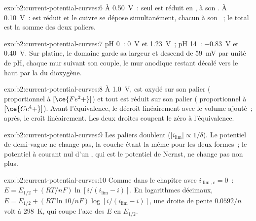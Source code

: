 \begin{solution}{exo:b2:current-potential-curves:6}
À \qty{0.50}{V}~: seul  est réduit en , à son .
À \qty{0.10}{V}~:  est réduit et le cuivre se dépose simultanément,
chacun à son ~; le total est la somme des deux paliers.
\end{solution}

\begin{solution}{exo:b2:current-potential-curves:7}
pH 0~: \qty{0}{V} et \qty{1.23}{V}~; pH 14~: \qty{-0.83}{V} et \qty{0.40}{V}. Sur
platine, le domaine garde sa largeur et descend de \qty{59}{mV} par unité de pH,
chaque mur suivant son couple, le mur anodique restant décalé vers le haut par la 
du dioxygène.
\end{solution}

\begin{solution}{exo:b2:current-potential-curves:8}
À \qty{1.0}{V},  est oxydé sur son palier (
proportionnel à $[\ce{Fe^2+}]$) et tout  est réduit sur son palier
( proportionnel à $[\ce{Ce^4+}]$). Avant l'équivalence, le
 décroît linéairement avec le volume ajouté~; après, le 
croît linéairement. Les deux droites coupent le zéro à l'équivalence.
\end{solution}

\begin{solution}{exo:b2:current-potential-curves:9}
Les paliers doublent ($|i_{\lim}| \propto 1/\delta$). Le potentiel de demi-vague ne
change pas, la couche étant la même pour les deux formes~; le potentiel à courant nul
d'un , qui est le potentiel de Nernst, ne change pas non plus.
\end{solution}

\begin{solution}{exo:b2:current-potential-curves:10}
Comme dans le chapitre avec $i_{\lim,c} = 0$~: $E = E_{1/2} + (RT/nF)\ln[i/(i_{\lim} -
i)]$. En logarithmes décimaux, $E = E_{1/2} + (RT\ln 10/nF)\log[i/(i_{\lim} - i)]$,
une droite de pente $0.0592/n$ volt à \qty{298}{K}, qui coupe l'axe des
$E$ en $E_{1/2}$.
\end{solution}

